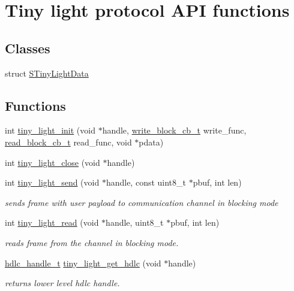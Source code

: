 \hypertarget{group__LIGHT__API}{}\section{Tiny light protocol A\+PI functions}
\label{group__LIGHT__API}
\subsection*{Classes}
\begin{DoxyCompactItemize}
\item 
struct \hyperlink{structSTinyLightData}{S\+Tiny\+Light\+Data}
\end{DoxyCompactItemize}
\subsection*{Functions}
\begin{DoxyCompactItemize}
\item 
int \hyperlink{group__LIGHT__API_ga221cf790724163d1aee89ad6a6c9a14d}{tiny\+\_\+light\+\_\+init} (void $\ast$handle, \hyperlink{tiny__types_8h_aafd634660bba76cace57a8f9b01e044d}{write\+\_\+block\+\_\+cb\+\_\+t} write\+\_\+func, \hyperlink{tiny__types_8h_a15bec127d9ee63658563d62e92b5261b}{read\+\_\+block\+\_\+cb\+\_\+t} read\+\_\+func, void $\ast$pdata)
\item 
int \hyperlink{group__LIGHT__API_ga6e045b8f4ef551c274fbacaa625e2748}{tiny\+\_\+light\+\_\+close} (void $\ast$handle)
\item 
int \hyperlink{group__LIGHT__API_ga12391f0d4c06fb6296b84fd4681a87f7}{tiny\+\_\+light\+\_\+send} (void $\ast$handle, const uint8\+\_\+t $\ast$pbuf, int len)
\begin{DoxyCompactList}\small\item\em sends frame with user payload to communication channel in blocking mode \end{DoxyCompactList}\item 
int \hyperlink{group__LIGHT__API_ga0181db79922917957779e1f2d740c407}{tiny\+\_\+light\+\_\+read} (void $\ast$handle, uint8\+\_\+t $\ast$pbuf, int len)
\begin{DoxyCompactList}\small\item\em reads frame from the channel in blocking mode. \end{DoxyCompactList}\item 
\hyperlink{group__HDLC__API_gabeaf7578aed5279d3af891bd85a9f961}{hdlc\+\_\+handle\+\_\+t} \hyperlink{group__LIGHT__API_gabf582877977ecd57299d8675a1279e36}{tiny\+\_\+light\+\_\+get\+\_\+hdlc} (void $\ast$handle)
\begin{DoxyCompactList}\small\item\em returns lower level hdlc handle. \end{DoxyCompactList}\end{DoxyCompactItemize}


